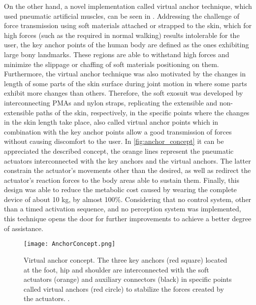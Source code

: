 On the other hand, a novel implementation called virtual anchor technique, which used pneumatic artificial muscles, can be seen in \cite{wehner2013lightweight}. Addressing the challenge of force transmission using soft materials attached or strapped to the skin, which for high forces (such as the required in normal walking) results intolerable for the user, the key anchor points of the human body are defined as the ones exhibiting large bony landmarks. These regions are able to withstand high forces and minimize the slippage or chaffing of soft materials positioning on them. Furthermore, the virtual anchor technique was also motivated by the changes in length of some parts of the skin surface during joint motion in where some parts exhibit more changes than others. Therefore, the soft exosuit was developed by interconnecting PMAs and nylon straps, replicating the extensible and non-extensible paths of the skin, respectively, in the specific points where the changes in the skin length take place, also called virtual anchor points which in combination with the key anchor points allow a good transmission of forces without causing discomfort to the user. In \autoref{fig:anchor_concept} it can be appreciated the described concept, the orange lines represent the pneumatic actuators interconnected with the key anchors and the virtual anchors. The latter constrain the actuator's movements other than the desired, as well as redirect the actuator's reaction forces to the body areas able to sustain them. Finally, this design was able to reduce the metabolic cost caused by wearing the complete device of about 10 kg, by almost 100\%. Considering that no control system, other than a timed activation sequence, and no perception system was implemented, this technique opens the door for further improvements to achieve a better degree of assistance.

\begin{figure}[hbtp!]
    \centering
    \texttt{[image: AnchorConcept.png]}
    \caption{Virtual anchor concept. The three key anchors (red square) located at the foot, hip and shoulder are interconnected with the soft actuators (orange) and auxiliary connectors (black) in specific points called virtual anchors (red circle) to stabilize the forces created by the actuators. \cite{wehner2013lightweight}. }
    \label{fig:anchor_concept}
\end{figure}

